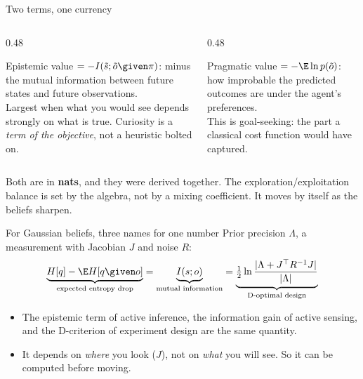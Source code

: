 \begin{frame}{Two terms, one currency}
  \begin{columns}[T]
    \begin{column}{0.48\textwidth}
      \begin{block}{Epistemic value}
        $=-I(\tilde s;\tilde o\given\pi)$: minus the mutual information between future states and
        future observations.\\[0.3em]
        Largest when what you would see depends strongly on what is true. Curiosity is a
        \emph{term of the objective}, not a heuristic bolted on.
      \end{block}
    \end{column}
    \begin{column}{0.48\textwidth}
      \begin{block}{Pragmatic value}
        $=-\E\ln p(\tilde o)$: how improbable the predicted outcomes are under the agent's
        preferences.\\[0.3em]
        This is goal-seeking: the part a classical cost function would have captured.
      \end{block}
    \end{column}
  \end{columns}
  \vspace{0.6em}
  Both are in \textbf{nats}, and they were derived together. The exploration/exploitation balance is
  set by the algebra, not by a mixing coefficient. It moves by itself as the beliefs sharpen.
\end{frame}

\begin{frame}{For Gaussian beliefs, three names for one number}
  Prior precision $\Lambda$, a measurement with Jacobian $J$ and noise $R$:
  \[
    \underbrace{H[q]-\E H[q\given o]}_{\text{expected entropy drop}}
    = \underbrace{I(s;o)}_{\text{mutual information}}
    = \underbrace{\tfrac12\ln\frac{|\Lambda + J^\top R^{-1}J|}{|\Lambda|}}_{\text{D-optimal design}}
  \]
  \begin{itemize}
    \item The epistemic term of active inference, the information gain of active sensing, and
          the D-criterion of experiment design are \alert{the same quantity}.
    \item It depends on \emph{where} you look ($J$), not on \emph{what} you will see. So it can be
          computed before moving.
  \end{itemize}
\end{frame}

